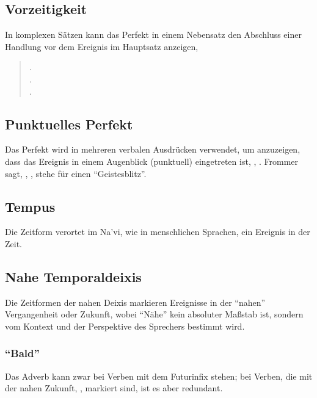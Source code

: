 \subsection{Vorzeitigkeit} In komplexen Sätzen kann das Perfekt in einem Nebensatz den Abschluss einer Handlung vor dem Ereignis im Hauptsatz anzeigen, 

\begin{quotation}
	\noindent{}.\\
	\indent{}.\\
	
	\noindent{}.\\
	\indent{}
\end{quotation}

\subsection{Punktuelles Perfekt} Das Perfekt wird in mehreren verbalen Ausdrücken verwendet, um anzuzeigen, dass das Ereignis in einem Augenblick (punktuell) eingetreten ist,  ,  . Frommer sagt, , , stehe für einen ``Geistesblitz''.

\subsection{Tempus} Die Zeitform verortet im Na'vi, wie in menschlichen Sprachen, ein Ereignis in der Zeit.


\subsection{Nahe Temporaldeixis} Die Zeitformen der nahen Deixis markieren Ereignisse in der ``nahen'' Vergangenheit oder Zukunft, wobei ``Nähe'' kein absoluter Maßstab ist, sondern vom Kontext und der Perspektive des Sprechers bestimmt wird.

\subsubsection{``Bald''} Das Adverb   kann zwar bei Verben mit dem Futurinfix  stehen; bei Verben, die mit der nahen Zukunft, , markiert sind, ist es aber redundant.

